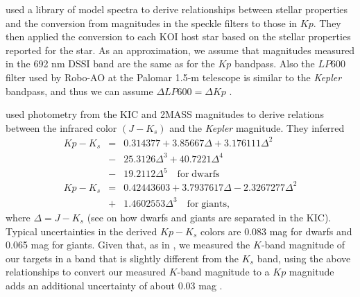 \documentclass[twocolumn,appendixfloats]{aastex6}
\begin{document}
\citet{everett15} used a library of model spectra to derive relationships between 
stellar properties and the conversion from magnitudes in the speckle filters to 
those in $Kp$. They then applied the conversion to each KOI host star based 
on the stellar properties reported for the star. As an approximation, we assume
that magnitudes measured in the 692 nm DSSI band are the same as for the 
$Kp$ bandpass.
Also the $LP600$ filter used by Robo-AO at the Palomar 1.5-m telescope
is similar to the {\it Kepler} bandpass, and thus we can assume $\Delta LP600 =
\Delta Kp$ \citep{law14, baranec16, ziegler16}.

\citet{howell12} used photometry from the KIC and 2MASS magnitudes to derive
relations between the infrared color $(J-K_s)$ and the {\it Kepler} magnitude.
They inferred
\begin{eqnarray}
Kp - K_s & = & 0.314377 + 3.85667 \Delta + 3.176111 \Delta^2 \nonumber \\
& - & 25.3126 \Delta^3 + 40.7221 \Delta^4  \nonumber \\
& - & 19.2112 \Delta^5 \quad \mathrm{for \; dwarfs} \nonumber \\
Kp - K_s & = & 0.42443603 + 3.7937617 \Delta -2.3267277 \Delta^2 \nonumber \\
& + & 1.4602553 \Delta^3 
\mathrm{\quad for \;  giants,}
\end{eqnarray} 
where $\Delta=J-K_s$ (see \citealt{ciardi11} on how dwarfs and giants are
separated in the KIC). Typical uncertainties in the derived $Kp-K_s$ colors
are 0.083 mag for dwarfs and 0.065 mag for giants. Given that, as in
\citet{howell12}, we measured the $K$-band magnitude of our targets in
a band that is slightly different from the $K_s$ band, using the above
relationships to convert our measured $K$-band magnitude to a $Kp$
magnitude adds an additional uncertainty of about 0.03 mag 
\citep[see][]{howell12}.
\end{document}
